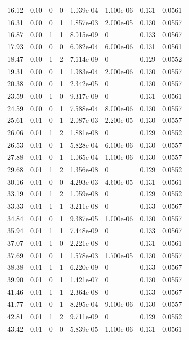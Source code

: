 \documentclass[preview]{standalone}
\begin{document}
{{\begin{tabular}{L{1.2cm}C{1.2cm} C{0.3cm}C{0.5cm} C{1.4cm}C{1.4cm} C{1.4cm}C{1.4cm}}
  16.12  &  0.00  & 0     &  0 &  1.039e-04  & 1.000e-06  & 0.131 &  0.0561   \\ 
  16.31  &  0.00  & 0     &  1 &  1.857e-03  & 2.000e-05  & 0.130 &  0.0557   \\ 
  16.87  &  0.00  & 1     &  1 &  8.015e-09  & 0  & 0.133 &  0.0567   \\ 
  17.93  &  0.00  & 0     &  0 &  6.082e-04  & 6.000e-06  & 0.131 &  0.0561   \\ 
  18.47  &  0.00  & 1     &  2 &  7.614e-09  & 0  & 0.129 &  0.0552   \\ 
  19.31  &  0.00  & 0     &  1 &  1.983e-04  & 2.000e-06  & 0.130 &  0.0557   \\ 
  20.38  &  0.00  & 0     &  1 &  2.342e-05  & 0  & 0.130 &  0.0557   \\ 
  23.59  &  0.00  & 1     &  0 &  9.317e-09  & 0  & 0.131 &  0.0561   \\ 
  24.59  &  0.00  & 0     &  1 &  7.588e-04  & 8.000e-06  & 0.130 &  0.0557   \\ 
  25.61  &  0.01  & 0     &  1 &  2.087e-03  & 2.200e-05  & 0.130 &  0.0557   \\ 
  26.06  &  0.01  & 1     &  2 &  1.881e-08  & 0  & 0.129 &  0.0552   \\ 
  26.53  &  0.01  & 0     &  1 &  5.828e-04  & 6.000e-06  & 0.130 &  0.0557   \\ 
  27.88  &  0.01  & 0     &  1 &  1.065e-04  & 1.000e-06  & 0.130 &  0.0557   \\ 
  29.68  &  0.01  & 1     &  2 &  1.356e-08  & 0  & 0.129 &  0.0552   \\ 
  30.16  &  0.01  & 0     &  0 &  4.293e-03  & 4.600e-05  & 0.131 &  0.0561   \\ 
  33.19  &  0.01  & 1     &  2 &  1.059e-08  & 0  & 0.129 &  0.0552   \\ 
  33.33  &  0.01  & 1     &  1 &  3.211e-08  & 0  & 0.133 &  0.0567   \\ 
  34.84  &  0.01  & 0     &  1 &  9.387e-05  & 1.000e-06  & 0.130 &  0.0557   \\ 
  35.94  &  0.01  & 1     &  1 &  7.448e-09  & 0  & 0.133 &  0.0567   \\ 
  37.07  &  0.01  & 1     &  0 &  2.221e-08  & 0  & 0.131 &  0.0561   \\ 
  37.69  &  0.01  & 0     &  1 &  1.578e-03  & 1.700e-05  & 0.130 &  0.0557   \\ 
  38.38  &  0.01  & 1     &  1 &  6.220e-09  & 0  & 0.133 &  0.0567   \\ 
  39.90  &  0.01  & 0     &  1 &  1.421e-07  & 0  & 0.130 &  0.0557   \\ 
  41.46  &  0.01  & 1     &  1 &  2.364e-08  & 0  & 0.133 &  0.0567   \\ 
  41.77  &  0.01  & 0     &  1 &  8.295e-04  & 9.000e-06  & 0.130 &  0.0557   \\ 
  42.81  &  0.01  & 1     &  2 &  9.711e-09  & 0  & 0.129 &  0.0552   \\ 
  43.42  &  0.01  & 0     &  0 &  5.839e-05  & 1.000e-06  & 0.131 &  0.0561   \\ 
\hline 
\end{tabular} 

}}
\end{document}
